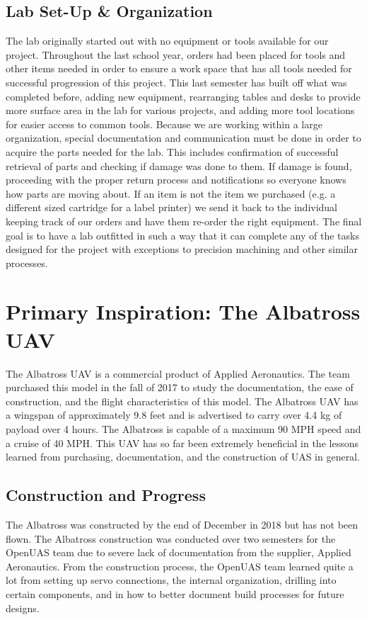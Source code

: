 \documentclass{article}
\begin{document}
\subsection{Lab Set-Up \& Organization}
The lab originally started out with no equipment or tools available for our project. Throughout the last school year, orders had been placed for tools and other items needed in order to ensure a work space that has all tools needed for successful progression of this project. This last semester has built off what was completed before, adding new equipment, rearranging tables and desks to provide more surface area in the lab for various projects, and adding more tool locations for easier access to common tools.  Because we are working within a large organization, special documentation and communication must be done in order to acquire the parts needed for the lab. This includes confirmation of successful retrieval of parts and checking if damage was done to them. If damage is found, proceeding with the proper return process and notifications so everyone knows how parts are moving about. If an item is not the item we purchased (e.g. a different sized cartridge for a label printer) we send it back to the individual keeping track of our orders and have them re-order the right equipment. The final goal is to have a lab outfitted in such a way that it can complete any of the tasks designed for the project with exceptions to precision machining and other similar processes.

\section{Primary Inspiration: The Albatross UAV}
The Albatross UAV is a commercial product of Applied Aeronautics. The team purchased this model in the fall of 2017 to study the documentation, the ease of construction, and the flight characteristics of this model. The Albatross UAV has a wingspan of approximately 9.8 feet and is advertised to carry over 4.4 kg of payload over 4 hours. The Albatross is capable of a maximum 90 MPH speed and a cruise of 40 MPH. This UAV has so far been extremely beneficial in the lessons learned from purchasing, documentation, and the construction of UAS in general.

\subsection{Construction and Progress}
The Albatross was constructed by the end of December in 2018 but has not been flown. The Albatross construction was conducted over two semesters for the OpenUAS team due to severe lack of documentation from the supplier, Applied Aeronautics. From the construction process, the OpenUAS team learned quite a lot from setting up servo connections, the internal organization, drilling into certain components, and in how to better document build processes for future designs.
\end{document}

